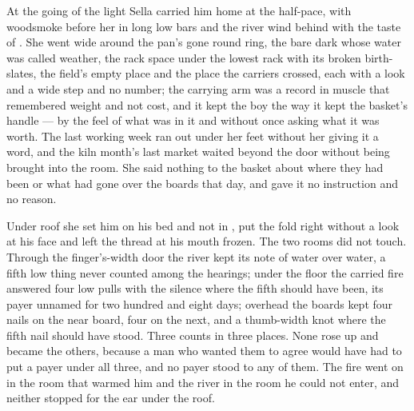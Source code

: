 At the going of the light Sella carried him home at the half-pace, with woodsmoke before her in long low bars and the river wind behind with the taste of . She went wide around the pan's gone round ring, the bare dark  whose water was called weather, the rack space under the lowest rack with its broken birth-slates, the field's empty place and the place the carriers crossed, each with a look and a wide step and no number; the carrying arm was a record in muscle that remembered weight and not cost, and it kept the boy the way it kept the basket's handle --- by the feel of what was in it and without once asking what it was worth. The last working week ran out under her feet without her giving it a word, and the kiln month's last market waited beyond the door without being brought into the room. She said nothing to the basket about where they had been or what had gone over the boards that day, and gave it no instruction and no reason.

Under  roof she set him on his bed and not in , put the fold right without a look at his face and left the thread at his mouth frozen. The two rooms did not touch. Through the finger's-width door the river kept its note of water over water, a fifth low thing never counted among the hearings; under the floor the carried fire answered four low pulls with the silence where the fifth should have been, its payer unnamed for two hundred and eight days; overhead the boards kept four nails on the near board, four on the next, and a thumb-width knot where the fifth nail should have stood. Three counts in three places. None rose up and became the others, because a man who wanted them to agree would have had to put a payer under all three, and no payer stood to any of them. The fire went on in the room that warmed him and the river in the room he could not enter, and neither stopped for the ear under the roof.

